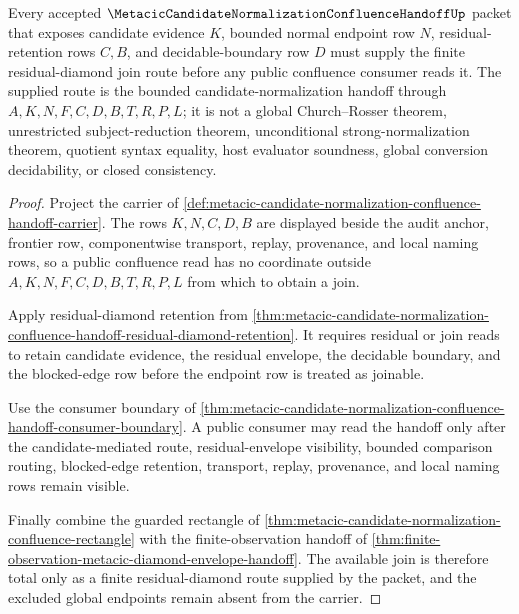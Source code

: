\begin{theorem}
\label{thm:metacic-candidate-normalization-confluence-handoff-residual-diamond-totality}
Every accepted $\MetacicCandidateNormalizationConfluenceHandoffUp$ packet that exposes candidate evidence $K$, bounded normal endpoint row $N$, residual-retention rows $C,B$, and decidable-boundary row $D$ must supply the finite residual-diamond join route before any public confluence consumer reads it. The supplied route is the bounded candidate-normalization handoff through $A,K,N,F,C,D,B,T,R,P,L$; it is not a global Church--Rosser theorem, unrestricted subject-reduction theorem, unconditional strong-normalization theorem, quotient syntax equality, host evaluator soundness, global conversion decidability, or closed consistency.
\end{theorem}
\begin{proof}
Project the carrier of \autoref{def:metacic-candidate-normalization-confluence-handoff-carrier}. The rows $K,N,C,D,B$ are displayed beside the audit anchor, frontier row, componentwise transport, replay, provenance, and local naming rows, so a public confluence read has no coordinate outside $A,K,N,F,C,D,B,T,R,P,L$ from which to obtain a join.

Apply residual-diamond retention from \autoref{thm:metacic-candidate-normalization-confluence-handoff-residual-diamond-retention}. It requires residual or join reads to retain candidate evidence, the residual envelope, the decidable boundary, and the blocked-edge row before the endpoint row is treated as joinable.

Use the consumer boundary of \autoref{thm:metacic-candidate-normalization-confluence-handoff-consumer-boundary}. A public consumer may read the handoff only after the candidate-mediated route, residual-envelope visibility, bounded comparison routing, blocked-edge retention, transport, replay, provenance, and local naming rows remain visible.

Finally combine the guarded rectangle of \autoref{thm:metacic-candidate-normalization-confluence-rectangle} with the finite-observation handoff of \autoref{thm:finite-observation-metacic-diamond-envelope-handoff}. The available join is therefore total only as a finite residual-diamond route supplied by the packet, and the excluded global endpoints remain absent from the carrier.
\end{proof}

